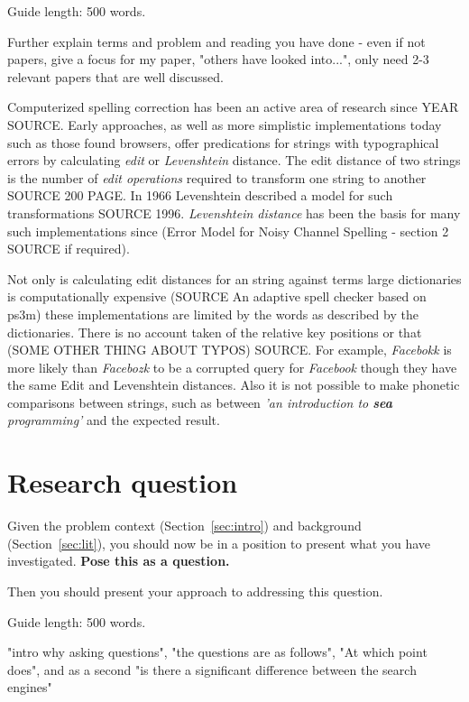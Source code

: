 \documentclass{csfourzero}
\begin{document}
Guide length: 500 words.

Further explain terms and problem and reading you have done - even if not papers, give a focus for my paper, "others have looked into...", only need 2-3 relevant papers that are well discussed.

Computerized spelling correction has been an active area of research since YEAR SOURCE. Early approaches, as well as more simplistic implementations today such as those found browsers, offer predications for strings with typographical errors by calculating \textit{edit} or \textit{Levenshtein } distance. The edit distance of two strings is the number of \textit{edit operations} required to transform one string to another SOURCE 200 PAGE. In 1966 Levenshtein described a model for such transformations SOURCE 1996. \textit{Levenshtein distance} has been the basis for many such implementations since (Error Model for Noisy Channel Spelling - section 2 SOURCE if required).

Not only is calculating edit distances for an string against terms large dictionaries is computationally expensive (SOURCE An adaptive spell checker based on ps3m) these implementations are limited by the words as described by the dictionaries. There is no account taken of the relative key positions or that (SOME OTHER THING ABOUT TYPOS) SOURCE. For example, \textit{Facebokk} is more likely than \textit{Facebozk} to be a corrupted query for \textit{Facebook} though they have the same Edit and Levenshtein distances. Also it is not possible to make phonetic comparisons between strings, such as between \textit{'an introduction to \textbf{sea} programming'} and the expected result.






\section{Research question}
\label{sec:rq}

Given the problem context (Section~\ref{sec:intro}) and background
(Section~\ref{sec:lit}), you should now be in a position to present
what you have investigated. \textbf{Pose this as a question.}

Then you should present your approach to addressing this
question.

Guide length: 500 words.

"intro why asking questions", "the questions are as follows", "At which point does", and as a second "is there a significant difference between the search engines"
\end{document}
